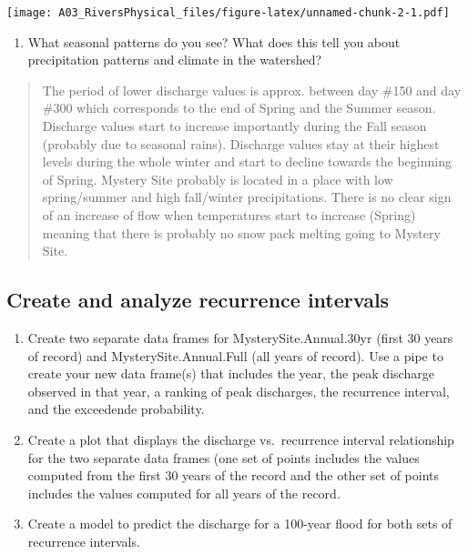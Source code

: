 \documentclass[]{article}
\providecommand{\tightlist}{%
  \setlength{\itemsep}{0pt}\setlength{\parskip}{0pt}}
\begin{document}
\texttt{[image: A03\_RiversPhysical\_files/figure-latex/unnamed-chunk-2-1.pdf]}

\begin{enumerate}
\def\labelenumi{\arabic{enumi}.}
\setcounter{enumi}{7}
\tightlist
\item
  What seasonal patterns do you see? What does this tell you about
  precipitation patterns and climate in the watershed?
\end{enumerate}

\begin{quote}
The period of lower discharge values is approx. between day \#150 and
day \#300 which corresponds to the end of Spring and the Summer season.
Discharge values start to increase importantly during the Fall season
(probably due to seasonal rains). Discharge values stay at their highest
levels during the whole winter and start to decline towards the
beginning of Spring. Mystery Site probably is located in a place with
low spring/summer and high fall/winter precipitations. There is no clear
sign of an increase of flow when temperatures start to increase (Spring)
meaning that there is probably no snow pack melting going to Mystery
Site.
\end{quote}

\hypertarget{create-and-analyze-recurrence-intervals}{%
\subsection{Create and analyze recurrence
intervals}\label{create-and-analyze-recurrence-intervals}}

\begin{enumerate}
\def\labelenumi{\arabic{enumi}.}
\setcounter{enumi}{8}
\item
  Create two separate data frames for MysterySite.Annual.30yr (first 30
  years of record) and MysterySite.Annual.Full (all years of record).
  Use a pipe to create your new data frame(s) that includes the year,
  the peak discharge observed in that year, a ranking of peak
  discharges, the recurrence interval, and the exceedende probability.
\item
  Create a plot that displays the discharge vs.~recurrence interval
  relationship for the two separate data frames (one set of points
  includes the values computed from the first 30 years of the record and
  the other set of points includes the values computed for all years of
  the record.
\item
  Create a model to predict the discharge for a 100-year flood for both
  sets of recurrence intervals.
\end{enumerate}
\end{document}
